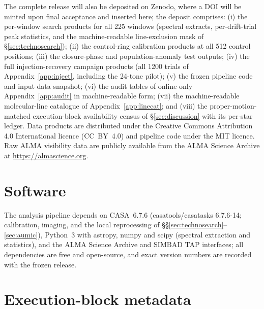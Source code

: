 \documentclass{openjournal}
\begin{document}
The complete release will also be deposited on Zenodo, where a DOI
will be minted upon final acceptance and inserted here; the deposit
comprises: (i) the per-window search products for all 225 windows
(spectral extracts, per-drift-trial peak statistics, and the
machine-readable line-exclusion mask of \S\ref{sec:technosearch});
(ii) the control-ring calibration products at all 512 control
positions; (iii) the closure-phase and population-anomaly test
outputs; (iv) the full injection-recovery campaign products (all 1200
trials of Appendix~\ref{app:inject}, including the 24-tone pilot);
(v) the frozen pipeline code and input data snapshot; (vi) the audit
tables of online-only Appendix~\ref{app:audit} in machine-readable
form; (vii) the machine-readable molecular-line catalogue of
Appendix~\ref{app:linecat}; and (viii) the proper-motion-matched
execution-block availability census of \S\ref{sec:discussion} with
its per-star ledger. Data products are distributed under the Creative
Commons Attribution 4.0 International licence (CC~BY~4.0) and
pipeline code under the MIT licence. Raw ALMA visibility data are
publicly available from the ALMA Science Archive at
\url{https://almascience.org}.

\section*{Software}
The analysis pipeline depends on CASA~6.7.6 (casatools/casatasks
6.7.6-14; calibration, imaging, and the local reprocessing of
\S\S\ref{sec:technosearch}--\ref{sec:aumic}), Python~3 with astropy,
numpy and scipy (spectral extraction and statistics), and the ALMA
Science Archive and SIMBAD TAP interfaces; all dependencies are free
and open-source, and exact version numbers are recorded with the
frozen release.


\appendix
\section{Execution-block metadata}
\label{app:ebs}
\end{document}
